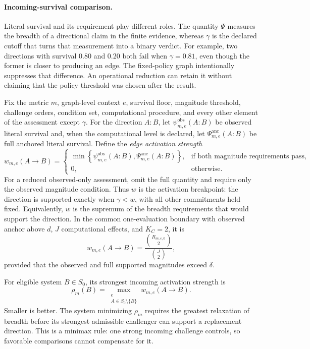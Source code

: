 \documentclass[11pt]{article}
\theoremstyle{remark}
\begin{document}
\paragraph{Incoming-survival comparison.}
Literal survival and its requirement play different roles. The quantity
$\Psi$ measures the breadth of a directional claim in the finite evidence,
whereas $\gamma$ is the declared cutoff that turns that measurement into a
binary verdict. For example, two directions with survival $0.80$ and $0.20$
both fail when $\gamma=0.81$, even though the former is closer to producing an
edge. The fixed-policy graph intentionally suppresses that difference. An
operational reduction can retain it without claiming that the policy threshold
was chosen after the result.

Fix the metric $m$, graph-level context $e$, survival floor, magnitude
threshold, challenge orders, condition set, computational procedure, and every
other element of the assessment except $\gamma$. For the direction $A:B$, let
$\psi^{\mathrm{obs}}_{m,e}(A:B)$ be observed literal survival and, when the
computational level is declared, let
$\Psi^{\mathrm{anc}}_{m,e}(A:B)$ be full anchored literal survival. Define the
\emph{edge activation strength}
\begin{equation}
w_{m,e}(A\to B)
=
\begin{cases}
\min\!\left\{
\psi^{\mathrm{obs}}_{m,e}(A:B),
\Psi^{\mathrm{anc}}_{m,e}(A:B)
\right\},
& \text{if both magnitude requirements pass},\\
0, & \text{otherwise}.
\end{cases}
\label{eq:edge-activation-strength}
\end{equation}
For a reduced observed-only assessment, omit the full quantity and require
only the observed magnitude condition. Thus $w$ is the activation breakpoint:
the direction is supported exactly when $\gamma<w$, with all other
commitments held fixed. Equivalently, $w$ is the supremum of the breadth
requirements that would support the direction. In the common one-evaluation
boundary with observed anchor above $d$, $J$ computational effects, and
$K_C=2$, it is
\[
w_{m,e}(A\to B)
=
\frac{\binom{R_{m,e,0}}{2}}{\binom{J}{2}},
\]
provided that the observed and full supported magnitudes exceed $\delta$.

For eligible system $B\in S_0$, its strongest incoming activation strength is
\begin{equation}
\rho_m(B)
=
\max_{\substack{e\\A\in S_0\setminus\{B\}}}
w_{m,e}(A\to B).
\label{eq:incoming-survival-minimax}
\end{equation}
Smaller is better. The system minimizing $\rho_m$ requires the greatest
relaxation of breadth before its strongest admissible challenger can support a
replacement direction. This is a minimax rule: one strong incoming challenge
controls, so favorable comparisons cannot compensate for it.
\end{document}
